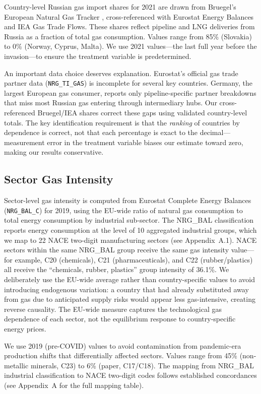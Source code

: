 \documentclass[12pt]{article}
\begin{document}
Country-level Russian gas import shares for 2021 are drawn from Bruegel's European Natural Gas Tracker \citep{mcwilliams2022}, cross-referenced with Eurostat Energy Balances and IEA Gas Trade Flows. These shares reflect pipeline and LNG deliveries from Russia as a fraction of total gas consumption. Values range from 85\% (Slovakia) to 0\% (Norway, Cyprus, Malta). We use 2021 values---the last full year before the invasion---to ensure the treatment variable is predetermined.

An important data choice deserves explanation. Eurostat's official gas trade partner data (\texttt{NRG\_TI\_GAS}) is incomplete for several key countries. Germany, the largest European gas consumer, reports only pipeline-specific partner breakdowns that miss most Russian gas entering through intermediary hubs. Our cross-referenced Bruegel/IEA shares correct these gaps using validated country-level totals. The key identification requirement is that the \textit{ranking} of countries by dependence is correct, not that each percentage is exact to the decimal---measurement error in the treatment variable biases our estimate toward zero, making our results conservative.

\subsection{Sector Gas Intensity}

Sector-level gas intensity is computed from Eurostat Complete Energy Balances (\texttt{NRG\_BAL\_C}) for 2019, using the EU-wide ratio of natural gas consumption to total energy consumption by industrial sub-sector. The NRG\_BAL classification reports energy consumption at the level of 10 aggregated industrial groups, which we map to 22 NACE two-digit manufacturing sectors (see Appendix~A.1). NACE sectors within the same NRG\_BAL group receive the same gas intensity value---for example, C20 (chemicals), C21 (pharmaceuticals), and C22 (rubber/plastics) all receive the ``chemicals, rubber, plastics'' group intensity of 36.1\%. We deliberately use the EU-wide average rather than country-specific values to avoid introducing endogenous variation: a country that had already substituted away from gas due to anticipated supply risks would appear less gas-intensive, creating reverse causality. The EU-wide measure captures the technological gas dependence of each sector, not the equilibrium response to country-specific energy prices.

We use 2019 (pre-COVID) values to avoid contamination from pandemic-era production shifts that differentially affected sectors. Values range from 45\% (non-metallic minerals, C23) to 6\% (paper, C17/C18). The mapping from NRG\_BAL industrial classification to NACE two-digit codes follows established concordances (see Appendix~A for the full mapping table).
\end{document}
